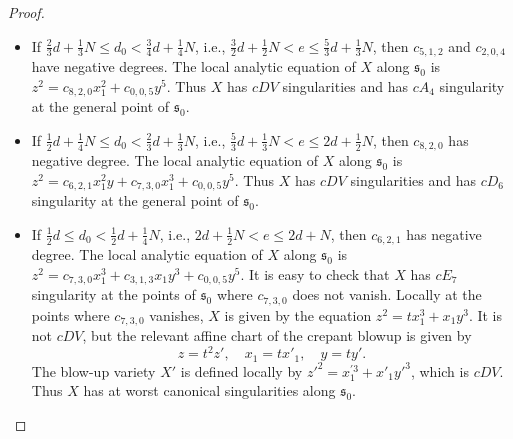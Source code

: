 \documentclass[a4paper,11pt]{amsart}
\newcommand{\s}{\ensuremath{\mathfrak{s}}}
\theoremstyle{definition}
\theoremstyle{remark}
\numberwithin{equation}{section}
\begin{document}
\begin{proof}
\begin{itemize}
		\item[(b1)] If $\frac23d + \frac13 N \le d_0 < \frac34d + \frac14 N$, i.e., $\frac32d + \frac12N < e \le \frac53d + \frac13N$, then $c_{5,1,2}$ and $c_{2,0,4}$ have negative degrees. The local analytic equation of $X$ along $\s_0$ is $z^2 = c_{8,2,0}x_1^2 + c_{0,0,5} y^5$. Thus $X$ has $cDV$ singularities and has $cA_4$ singularity at the general point of $\s_0$.
		
		\item[(c1)] If $\frac12d + \frac14 N \le d_0 < \frac23d + \frac13 N$, i.e., $\frac53d + \frac13N < e \le 2d + \frac12N$, then $c_{8,2,0}$ has negative degree. The local analytic equation of $X$ along $\s_0$ is $z^2 = c_{6,2,1}x_1^2y + c_{7,3,0}x_1^3 + c_{0,0,5}y^5$.  Thus $X$ has $cDV$ singularities and has $cD_6$ singularity at the general point of $\s_0$.
		
		
		
		
		\item[(d1)] If $\frac12d \le d_0 < \frac12d + \frac14 N $, i.e., $2d + \frac12N < e \le 2d + N$, then $c_{6,2,1}$ has negative degree. The local analytic equation of $X$ along $\s_0$ is $z^2 = c_{7,3,0}x_1^3 + c_{3, 1, 3}x_1y^3 + c_{0,0,5}y^5$. It is easy to check that $X$ has $cE_7$ singularity at the points of $\s_0$ where $c_{7,3,0}$ does not vanish. Locally at the points where $c_{7,3,0}$ vanishes, $X$ is given by the equation $z^2 = tx_1^3 + x_1y^3$. It is not $cDV$, but the relevant affine chart of the crepant blowup is given by 
        $$
        z=t^2z', \quad x_1=tx'_1, \quad y=ty'.
        $$
        The blow-up variety $X'$ is defined locally by $z'^2 = x_1^{'3} + x'_1y'^3$, which is $cDV$. Thus $X$ has at worst canonical singularities along $\s_0$.
        

\end{itemize}
\end{proof}
\end{document}

